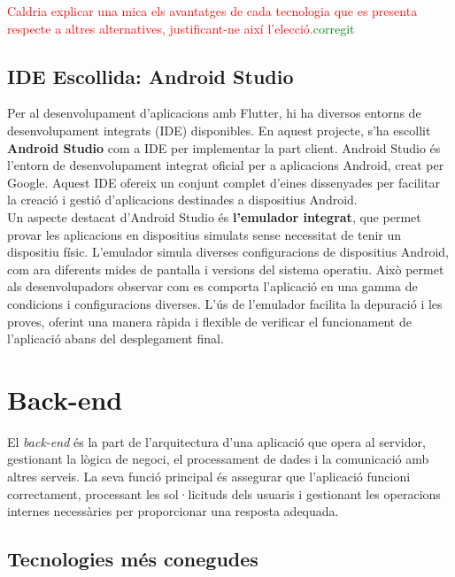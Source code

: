 \documentclass[a4paper,12pt,twoside]{ThesisStyle}
\newcommand{\pau}[1]{\textcolor{red}{#1}}
\newcommand{\sudan}[1]{\textcolor{green}{#1}}
\begin{document}
\pau{Caldria explicar una mica els avantatges de cada tecnologia que es presenta respecte a altres alternatives, justificant-ne així l'elecció.}\sudan{corregit}


\subsection{IDE Escollida: Android Studio}
\label{subsec:IDE Escollida: Android Studio}

Per al desenvolupament d'aplicacions amb Flutter, hi ha diversos entorns de desenvolupament integrats (IDE) disponibles. En aquest projecte, s'ha escollit \textbf{Android Studio} com a IDE per implementar la part client. Android Studio és l'entorn de desenvolupament integrat oficial per a aplicacions Android, creat per Google. Aquest IDE ofereix un conjunt complet d'eines dissenyades per facilitar la creació i gestió d'aplicacions destinades a dispositius Android.\\

Un aspecte destacat d'Android Studio és \textbf{l'emulador integrat}, que permet provar les aplicacions en dispositius simulats sense necessitat de tenir un dispositiu físic. L'emulador simula diverses configuracions de dispositius Android, com ara diferents mides de pantalla i versions del sistema operatiu. Això permet als desenvolupadors observar com es comporta l'aplicació en una gamma de condicions i configuracions diverses. L'ús de l'emulador facilita la depuració i les proves, oferint una manera ràpida i flexible de verificar el funcionament de l'aplicació abans del desplegament final.



\section{Back-end}
\label{sec: Back-end}

El \textit{back-end} és la part de l'arquitectura d'una aplicació que opera al servidor, gestionant la lògica de negoci, el processament de dades i la comunicació amb altres serveis. La seva funció principal és assegurar que l'aplicació funcioni correctament, processant les sol·licituds dels usuaris i gestionant les operacions internes necessàries per proporcionar una resposta adequada.


\subsection{Tecnologies més conegudes}
\label{subsec: Tecnologies més conegudes}
\end{document}
